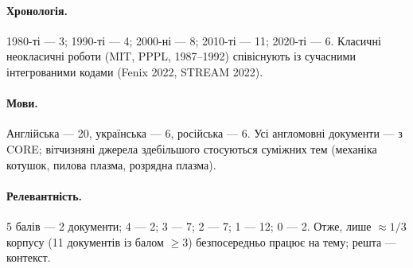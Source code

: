 \documentclass[11pt,a4paper]{article}
\begin{document}
\paragraph{Хронологія.} 1980-ті --- 3; 1990-ті --- 4; 2000-ні --- 8;
2010-ті --- 11; 2020-ті --- 6. Класичні неокласичні роботи (MIT, PPPL, 1987--1992)
співіснують із сучасними інтегрованими кодами (Fenix 2022, STREAM 2022).

\paragraph{Мови.} Англійська --- 20, українська --- 6, російська --- 6.
Усі англомовні документи --- з CORE; вітчизняні джерела здебільшого
стосуються суміжних тем (механіка котушок, пилова плазма, розрядна плазма).

\paragraph{Релевантність.} 5 балів --- 2 документи; 4 --- 2; 3 --- 7; 2 --- 7;
1 --- 12; 0 --- 2. Отже, лише $\approx 1/3$ корпусу (11 документів із балом $\ge 3$)
безпосередньо працює на тему; решта --- контекст.
\end{document}
